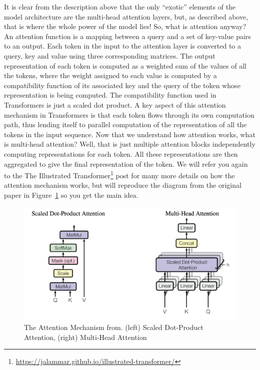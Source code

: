 \documentclass{article}
\begin{document}
It is clear from the description above that the only “exotic” elements of the model architecture are the 
multi-head attention layers, 
but, as described above, that is where the whole power of the model lies! So, what is attention anyway? An attention function is a mapping between a query and a set of key-value pairs to an output. 
Each token in the input to the attention layer is converted to a query, key and value using three corresponding matrices. The output representation of each token is computed as a weighted sum of the values of all the tokens, where the weight assigned to each value is computed by a compatibility function of its associated key and the query of the token whose representation is being computed. The compatibility function used in Transformers is just a scaled dot product. A key aspect of this attention mechanism in Transformers is that each token flows through its own computation path, thus lending itself to parallel computation of the representation of all the tokens in the input sequence. Now that we understand how attention works, what is multi-head attention? Well, that is just multiple attention blocks independently computing representations for each token. All these representations are then aggregated to give the final representation of the token. We will refer you again to the The Illustrated Transformer\footnote{\url{https://jalammar.github.io/illustrated-transformer/}} post for many more details on how the attention mechanism works, but will reproduce the diagram from the original paper in Figure~\ref{fig:attention} so you get the main idea.

\begin{figure}
    \centering
    \includegraphics[width=\textwidth,height=\textheight,keepaspectratio]{02-03.png}
    \caption{The Attention Mechanism from{\protect{}}. (left) Scaled Dot-Product Attention, (right) Multi-Head Attention}
    \label{fig:attention}
\end{figure}
\end{document}
